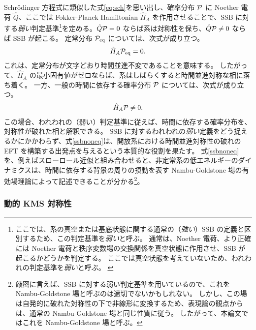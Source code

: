 \medskip
Schr\"odinger 方程式に類似した式\eqref{eq:sch}を思い出し、確率分布 ${\mathcal{P}}$ に Noether 電荷 $\hat{Q}$、ここでは Fokker-Planck Hamiltonian $\hat{H}_A$ を作用させることで、SSB に対する\textit{弱い}判定基準\footnote{
ここでは、系の真空または基底状態に関する通常の（\textit{強い}）SSB の定義と区別するため、この判定基準を\textit{弱い}と呼ぶ。
通常は、Noether 電荷、より正確には Noether 電荷と秩序変数場の交換関係を真空状態に作用させ、SSB が起こるかどうかを判定する。
ここでは真空状態を考えていないため、われわれの判定基準を\textit{弱い}と呼ぶ。
\label{footnote4}}を定める。$\hat Q {\mathcal{P}} = 0$ ならば系は対称性を保ち、$\hat Q {\mathcal{P}} \neq 0$ ならば SSB が起こる。
定常分布 ${\mathcal{P}}_{\rm eq}$ については、次式が成り立つ。
\begin{align}
 \hat H_A {\mathcal{P}}_{\rm eq} = 0.\label{nonssbeq}
\end{align}
これは、定常分布が文字どおり時間並進不変であることを意味する。
したがって、$\hat{H}_A$ の最小固有値がゼロならば、系はしばらくすると時間並進対称な相に落ち着く。
一方、一般の時間に依存する確率分布 ${\mathcal{P}}$ については、次式が成り立つ。
\begin{align}
 \hat H_A {\mathcal{P}} \neq 0. \label{ssbnoneq}
\end{align}
この場合、われわれの（弱い）判定基準に従えば、時間に依存する確率分布を、対称性が破れた相と解釈できる。
SSB に対するわれわれの\textit{弱い}定義をどう捉えるかにかかわらず、式\eqref{ssbnoneq}は、開放系における時間並進対称性の破れの EFT を構築する出発点を与えるという本質的な役割を果たす。
式\eqref{ssbnoneq}を、例えばスローロール近似と組み合わせると、非定常系の低エネルギーのダイナミクスは、時間に依存する背景の周りの摂動を表す Nambu-Goldstone 場の有効場理論によって記述できることが分かる\footnote{
厳密に言えば、SSB に対する弱い判定基準を用いているので、これを Nambu-Goldstone 場と呼ぶのは適切でないかもしれない。
しかし、この場は自発的に破れた対称性の下で非線形に変換するため、表現論の観点からは、通常の Nambu-Goldstone 場と同じ性質に従う。
したがって、本論文ではこれを Nambu-Goldstone 場と呼ぶ。}。


\subsubsection{動的 KMS 対称性}
\label{subsec:KMS_B}

